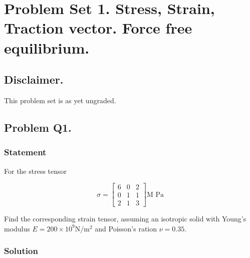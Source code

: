 %
%
%
%
%

\chapter{Problem Set 1.  Stress, Strain, Traction vector.  Force free equilibrium.}
\label{chap:continuumProblemSet1}
\date{Feb 8, 2012}

\beginArtWithToc

\section{Disclaimer.}

This problem set is as yet ungraded.

\section{Problem Q1.}
\subsection{Statement}

For the stress tensor

\begin{equation}\label{eqn:continuumProblemSet1:10}
\sigma =
\begin{bmatrix}
6 & 0 & 2 \\
0 & 1 & 1 \\
2 & 1 & 3
\end{bmatrix}
\text{M Pa}
\end{equation}

Find the corresponding strain tensor, assuming an isotropic solid with Young's modulus $E = 200 \times 10^9 \text{N}/\text{m}^2$ and Poisson's ration $\nu = 0.35$.

\subsection{Solution}

